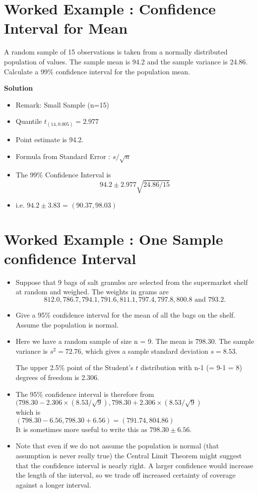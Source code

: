 \documentclass[]{report}
\begin{document}
\section{Worked Example : Confidence Interval for Mean }
A random sample of 15 observations is taken from a normally distributed population
of values. The sample mean is 94.2 and the sample variance is 24.86.
Calculate a 99\% confidence interval for the population mean.


\noindent \textbf{Solution}
\begin{itemize}
\item Remark: Small Sample (n=15)
\item Quantile $t_(14,0.005) = 2.977$
\item Point estimate is 94.2.
\item Formula from Standard Error : $ s/\sqrt{n}$
\item The 99\% Confidence Interval is \[94.2 \pm 2.977 \sqrt{24.86/15} \]
\item i.e. $94.2 \pm 3.83$ =  $(90.37,98.03)$
\end{itemize}

\section{Worked Example : One Sample confidence Interval}
\begin{itemize}
\item Suppose that 9 bags of salt granules are selected from the supermarket
shelf at random and weighed. The weights in grams are \[812.0, 786.7, 794.1,
791.6, 811.1, 797.4, 797.8, 800.8 \mbox{ and } 793.2.\] 
\item Give a 95\% confidence interval for the
mean of all the bags on the shelf. Assume the population is normal.


\item Here we have a random sample of size n = 9. The mean is 798.30. The sample
variance is $s^2 = 72.76$, which gives a sample standard deviation $s = 8.53$.

The upper 2.5\% point of the Student's $t$ distribution with n-1 (= 9-1 = 8) degrees of freedom is 2.306.

\item The 95\% confidence interval is therefore from \\
$(798.30 - 2.306 \times (8.53/\sqrt{9}), 798.30 + 2.306 \times (8.53/\sqrt{9})$\\
which is\\
$(798.30 - 6.56, 798.30 + 6.56) = (791.74, 804.86)$\\
It is sometimes more useful to write this as $798.30 \pm 6.56$.

\item Note that even if we do not assume the population is normal (that assumption is
never really true) the Central Limit Theorem might suggest that the confidence interval
is nearly right. A larger confidence would increase the length of the interval, so we
trade off increased certainty of coverage against a longer interval.
\end{itemize}
\end{document}
